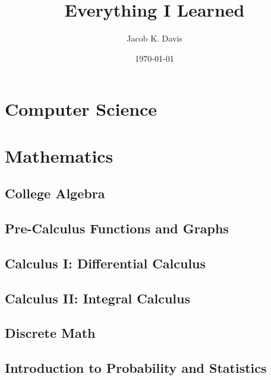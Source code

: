 \documentclass[11pt]{book}
\begin{document}
\title{Everything I Learned}
\author{Jacob K. Davis}
\date{\today}
\maketitle



\tableofcontents


\part{Computer Science}













\part{Mathematics}
\chapter{College Algebra}
\chapter{Pre-Calculus Functions and Graphs}
\chapter{Calculus I: Differential Calculus}
\chapter{Calculus II: Integral Calculus}

\chapter{Discrete Math}
\chapter{Introduction to Probability and Statistics}
\end{document}
